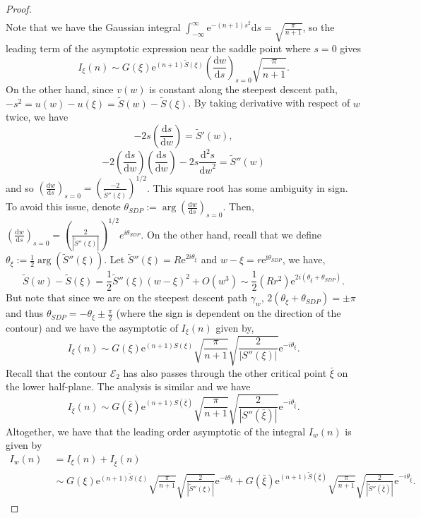 \documentclass[12pt]{amsart}
\newcommand{\tS}{{\widetilde S}}
\newcommand{\ds}{{\mathrm ds}}
\newcommand{\dw}{{\mathrm dw}}
\numberwithin{equation}{section}
\theoremstyle{definition}
\begin{document}
\begin{proof}
\begin{equation}
\begin{aligned}
        \end{aligned}
    \end{equation}
    Note that we have the Gaussian integral $\displaystyle \int_{-\infty}^\infty \mathrm e^{-(n+1)s^2} \ds=\sqrt{\frac{\pi}{n+1}}$, so the leading term of the asymptotic expression near the saddle point where $s=0$ gives 
    \[
    I_\xi(n) \sim G(\xi)\mathrm e^{(n+1)\tS(\xi)}\left(\frac{\mathrm dw}{\mathrm ds}\right)_{s=0} \sqrt{\frac{\pi}{n+1}}.
    \]
    On the other hand, since $v(w)$ is constant along the steepest descent path, $-s^2=u(w)-u(\xi)=\tS(w)-\tS(\xi)$. By taking derivative with respect of $w$ twice, we have 
    \[-2s\left(\frac{\ds}{\dw}\right)=\tS'(w),\]
    \[
    -2\left(\frac{\ds}{\dw}\right)\left(\frac{\ds}{\dw}\right)-2s\frac{\mathrm d^2s}{\dw^2}=\tS''(w)
    \]
    and so $\displaystyle \left(\frac{\dw}{\ds}\right)_{s=0}=\left(\frac{-2}{\tS''(\xi)}\right)^{1/2}$. 
   This square root has some ambiguity in sign. To avoid this issue, denote $\displaystyle \theta_{SDP}:=\operatorname{arg}\left(\frac{\mathrm d w}{\mathrm d s}\right)_{s=0}$. Then, 
  $ 
   \displaystyle \left(\frac{\dw}{\ds}\right)_{s=0}=\left(\frac{2}{|\tS''(\xi)|}\right)^{1/2}e^{i\theta_{SDP}}$. 
   On the other hand, recall that we define $\theta_\xi:=\frac{1}{2}\operatorname{arg}(\tS''(\xi))$. Let $\tS''(\xi)=R\mathrm e^{\mathrm 2i\theta_\xi}$ and $w-\xi=r\mathrm e^{\mathrm i \theta_{SDP}}$, we have,
   \[
     \tS(w)-\tS(\xi) = \frac{1}{2}\tS''(\xi)(w-\xi)^2 +O(w^3)\sim\frac{1}{2}(Rr^2)\mathrm e^{2i(\theta_\xi+\theta_{SDP})}.
     \]
    But note that since we are on the steepest descent path $\gamma_w$, $2(\theta_\xi+\theta_{SDP})=\pm \pi$ and thus $\theta_{SDP}=-\theta_\xi\pm\frac{\pi}{2}$ (where the sign is dependent on the direction of the contour) and we have the asymptotic of $I_\xi(n)$ given by, 
    \begin{equation}
        \label{eq: I(n) approx 3}
        I_\xi(n)\sim G(\xi)\mathrm e^{(n+1) S(\xi)}\sqrt{\frac{\pi}{n+1}}\sqrt{\frac{2}{|S''(\xi)|}}\mathrm e^{-i\theta_\xi}.
    \end{equation}
 Recall that the contour $\mathcal E_2$ has also passes through the other critical point $\bar \xi$ on the lower half-plane. The analysis is similar and we have
 \begin{equation}
        \label{eq: I(m) approx 4 conjugate}
        I_{\bar \xi}(n)\sim G(\bar \xi)\mathrm e^{(n+1)S(\bar \xi)}\sqrt{\frac{\pi}{n+1}}\sqrt{\frac{2}{|S''(\bar \xi)|}}\mathrm e^{-i\theta_{\bar \xi}}.
    \end{equation}
Altogether, we have that the leading order asymptotic of the integral $I_w(n)$ is given by
$$
\begin{aligned}
I_w(n)&\;=I_\xi(n)+I_{\bar \xi}(n)\\
&\;\sim G(\xi)\mathrm e^{(n+1) \tS(\xi)}\sqrt{\frac{\pi}{n+1}}\sqrt{\frac{2}{|\tS''(\xi)|}}\mathrm e^{-i\theta_\xi}+G(\bar \xi)\mathrm e^{(n+1) \tS(\bar \xi)}\sqrt{\frac{\pi}{n+1}}\sqrt{\frac{2}{|\tS''(\bar \xi)|}}\mathrm e^{-i\theta_{\bar \xi}}.
\end{aligned}
$$
 \end{proof}
\end{document}
